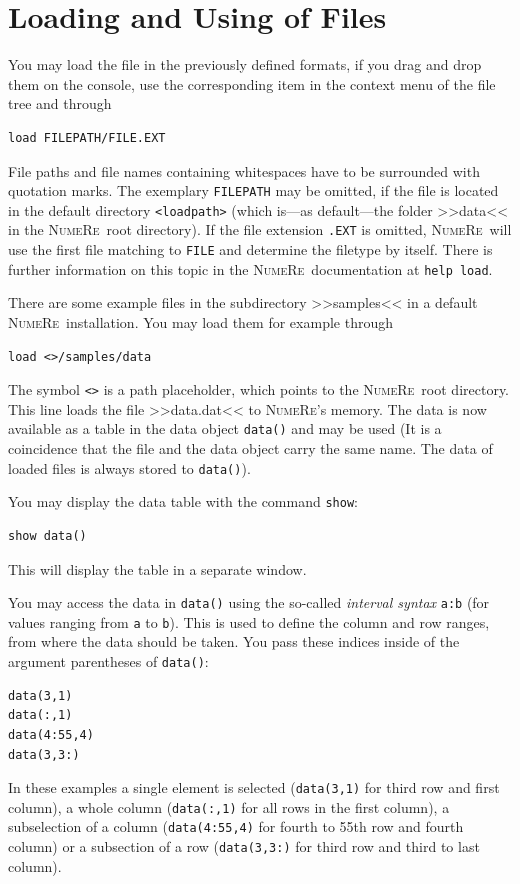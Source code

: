 \documentclass[DIV=14,headsepline,footsepline]{scrbook}
\newcommand{\NR}{\textsc{Nu\-me\-Re}}
\begin{document}
			\section{Loading and Using of Files}
				You may load the file in the previously defined formats, if you drag and drop them on the console, use the corresponding item in the context menu of the file tree and through
				\begin{lstlisting}
load FILEPATH/FILE.EXT
				\end{lstlisting}
				File paths and file names containing whitespaces have to be surrounded with quotation marks. The exemplary \lstinline+FILEPATH+ may be omitted, if the file is located in the default directory \lstinline+<loadpath>+ (which is---as default---the folder >>data<< in the \NR\ root directory). If the file extension \lstinline+.EXT+ is omitted, \NR\ will use the first file matching to \lstinline+FILE+ and determine the filetype by itself. There is further information on this topic in the \NR\ documentation at \lstinline+help load+.
				
				There are some example files in the subdirectory >>samples<< in a default \NR\ installation. You may load them for example through
				\begin{lstlisting}
load <>/samples/data
				\end{lstlisting}
				The symbol \lstinline+<>+ is a path placeholder, which points to the \NR\ root directory. This line loads the file >>data.dat<< to \NR's memory. The data is now available as a table in the data object \lstinline+data()+ and may be used (It is a coincidence that the file and the data object carry the same name. The data of loaded files is always stored to \lstinline+data()+).
				
				You may display the data table with the command \lstinline+show+:
				\begin{lstlisting}
show data()
				\end{lstlisting}
				This will display the table in a separate window.
				
				You may access the data in \lstinline+data()+ using the so-called \emph{interval syntax} \lstinline+a:b+ (for values ranging from \lstinline+a+ to \lstinline+b+). This is used to define the column and row ranges, from where the data should be taken. You pass these indices inside of the argument parentheses of \lstinline+data()+:
				\begin{lstlisting}
data(3,1)
data(:,1)
data(4:55,4)
data(3,3:)
				\end{lstlisting}
				In these examples a single element is selected (\lstinline+data(3,1)+ for third row and first column), a whole column (\lstinline+data(:,1)+ for all rows in the first column), a subselection of a column (\lstinline+data(4:55,4)+ for fourth to 55th row and fourth column) or a subsection of a row (\lstinline+data(3,3:)+ for third row and third to last column).
				
\end{document}
